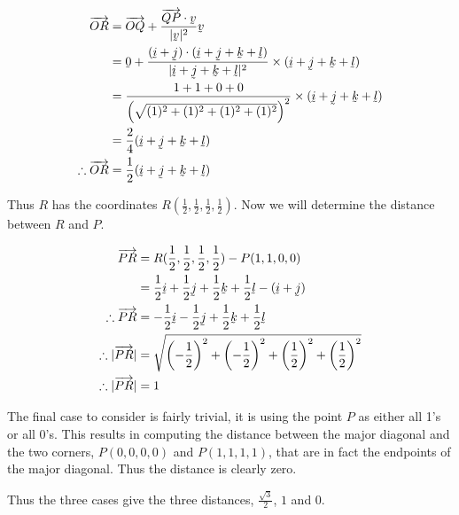 \documentclass[a4paper]{article}
\begin{document}
\begin{enumerate}[label=\textbf{\arabic*.}]
\begin{enumerate}
		\begin{align*}
		\overrightarrow{OR} & = \overrightarrow{OQ} + \frac{\overrightarrow{QP}\cdot{\underaccent{\tilde}{v}}}{|\underaccent{\tilde}{v}|^2}\underaccent{\tilde}{v}\\
		& = \underaccent{\tilde}{0} + \frac{(\underaccent{\tilde}{i} + \underaccent{\tilde}{j})\cdot(\underaccent{\tilde}{i} + \underaccent{\tilde}{j} + \underaccent{\tilde}{k} + \underaccent{\tilde}{l})}{|\underaccent{\tilde}{i} + \underaccent{\tilde}{j} + \underaccent{\tilde}{k} + \underaccent{\tilde}{l}|^2}\times(\underaccent{\tilde}{i} + \underaccent{\tilde}{j} + \underaccent{\tilde}{k} + \underaccent{\tilde}{l})\\
		& = \frac{1+1+0+0}{\left(\sqrt{(1)^2 + (1)^2 + (1)^2 + (1)^2}\right)^2}\times(\underaccent{\tilde}{i} + \underaccent{\tilde}{j} + \underaccent{\tilde}{k} + \underaccent{\tilde}{l})\\
		& = \frac{2}{4}(\underaccent{\tilde}{i} + \underaccent{\tilde}{j} + \underaccent{\tilde}{k} + \underaccent{\tilde}{l})\\
		\therefore \overrightarrow{OR} & = \frac{1}{2}(\underaccent{\tilde}{i} + \underaccent{\tilde}{j} + \underaccent{\tilde}{k} + \underaccent{\tilde}{l})\\
		\end{align*}	

		Thus $R$ has the coordinates $R(\frac{1}{2},\frac{1}{2},\frac{1}{2},\frac{1}{2})$. Now we will determine the distance between $R$ and $P$.

		\begin{align*}
		\overrightarrow{PR} & = R(\frac{1}{2},\frac{1}{2},\frac{1}{2},\frac{1}{2}) - P(1,1,0,0)\\
		& = \frac{1}{2}\underaccent{\tilde}{i} + \frac{1}{2}\underaccent{\tilde}{j} + \frac{1}{2}\underaccent{\tilde}{k} + \frac{1}{2}\underaccent{\tilde}{l} - (\underaccent{\tilde}{i} + \underaccent{\tilde}{j})\\
		\therefore \overrightarrow{PR} & = -\frac{1}{2}\underaccent{\tilde}{i} - \frac{1}{2}\underaccent{\tilde}{j} + \frac{1}{2}\underaccent{\tilde}{k} + \frac{1}{2}\underaccent{\tilde}{l}\\
		\therefore |\overrightarrow{PR}| & = \sqrt{\left(-\frac{1}{2}\right)^2 + \left(-\frac{1}{2}\right)^2 + \left(\frac{1}{2}\right)^2 + \left(\frac{1}{2}\right)^2}\\
		\therefore |\overrightarrow{PR}| & = 1\\
		\end{align*}

		The final case to consider is fairly trivial, it is using the point $P$ as either all 1's or all 0's. This results in computing the distance between the major diagonal and the two corners, $P(0,0,0,0)$ and $P(1,1,1,1)$, that are in fact the endpoints of the major diagonal. Thus the distance is clearly zero.
		
		Thus the three cases give the three distances, $\frac{\sqrt{3}}{2}$, $1$ and $0$.


	\end{enumerate}

\end{enumerate}
\end{document}

